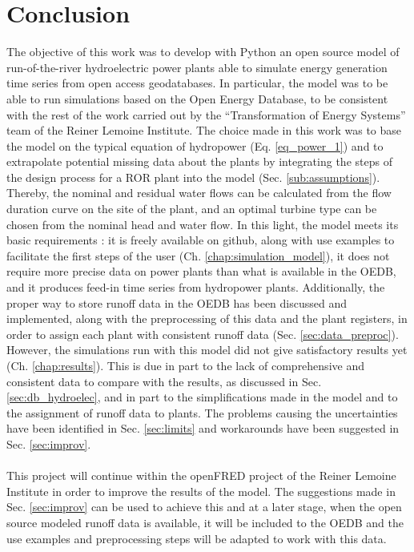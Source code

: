 \chapter{Conclusion}

The objective of this work was to develop with Python an open source model of run-of-the-river hydroelectric power plants able to simulate energy generation time series from open access geodatabases. In particular, the model was to be able to run simulations based on the Open Energy Database, to be consistent with the rest of the work carried out by the ``Transformation of Energy Systems'' team of the Reiner Lemoine Institute. \newline
The choice made in this work was to base the model on the typical equation of hydropower (Eq. \eqref{eq_power_1}) and to extrapolate potential missing data about the plants by integrating the steps of the design process for a ROR plant into the model (Sec. \ref{sub:assumptions}). Thereby, the nominal and residual water flows can be calculated from the flow duration curve on the site of the plant, and an optimal turbine type can be chosen from the nominal head and water flow. In this light, the model meets its basic requirements : it is freely available on github, along with use examples to facilitate the first steps of the user (Ch. \ref{chap:simulation_model}), it does not require more precise data on power plants than what is available in the OEDB, and it produces feed-in time series from hydropower plants. Additionally, the proper way to store runoff data in the OEDB has been discussed and implemented, along with the preprocessing of this data and the plant registers, in order to assign each plant with consistent runoff data (Sec. \ref{sec:data_preproc}). \newline
However, the simulations run with this model did not give satisfactory results yet (Ch. \ref{chap:results}). This is due in part to the lack of comprehensive and consistent data to compare with the results, as discussed in Sec. \ref{sec:db_hydroelec}, and in part to the simplifications made in the model and to the assignment of runoff data to plants. The problems causing the uncertainties have been identified in Sec. \ref{sec:limits} and workarounds have been suggested in Sec. \ref{sec:improv}. \\ \\
This project will continue within the openFRED project of the Reiner Lemoine Institute in order to improve the results of the model. The suggestions made in Sec. \ref{sec:improv} can be used to achieve this and at a later stage, when the open source modeled runoff data is available, it will be included to the OEDB and the use examples and preprocessing steps will be adapted to work with this data.\newline
